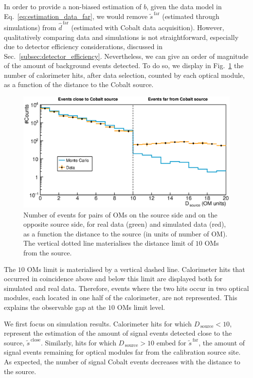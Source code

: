 In order to provide a non-biased estimation of $b$, given the data model in Eq.~\eqref{eq:estimation_data_far}, we would remove $\tilde{s}^{\,\text{far}}$ (estimated through simulations) from $\hat{d}^{\,\text{far}}$ (estimated with Cobalt data acquisition).
However, qualitatively comparing data and simulations is not straightforward, especially due to detector efficiency considerations, discussed in Sec.~\ref{subsec:detector_efficiency}.
Nevertheless, we can give an order of magnitude of the amount of background events detected.
To do so, we display in Fig.~\ref{fig:Co_data_bkg} the number of calorimeter hits, after data selection, counted by each optical module, as a function of the distance to the Cobalt source.
\begin{figure}[h]
  \centering
  \includegraphics[width=1.1\textwidth]{commissioning/fig_commissioning/Co_data_bkg.eps}
  \caption{Number of events for pairs of OMs on the source side and on the opposite source side, for real data (green) and simulated data (red), as a function the distance to the source (in units of number of OM).
    The vertical dotted line materialises the distance limit of $10$ OMs from the source.
    \label{fig:Co_data_bkg}}
\end{figure}
The $10$ OMs limit is materialised by a vertical dashed line.
Calorimeter hits that occurred in coincidence above and below this limit are displayed both for simulated and real data.
Therefore, events where the two hits occur in two optical modules, each located in one half of the calorimeter, are not represented.
This explains the observable gap at the $10$ OMs limit level.

We first focus on simulation results.
Calorimeter hits for which $D_{\,\text{source}}<10$, represent the estimation of the amount of signal events detected close to the source, $\tilde{s}^{\,\text{close}}$.
Similarly, hits for which $D_{\,\text{source}}>10$ embed for $\tilde{s}^{\,\text{far}}$, the amount of signal events remaining for optical modules far from the calibration source site.
As expected, the number of signal Cobalt events decreases with the distance to the source.


